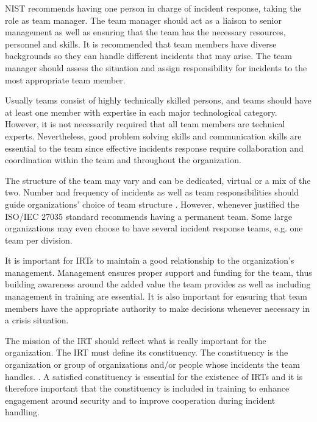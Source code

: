 \ac{NIST} recommends having one person in charge of incident response, taking the role as team manager. The team manager should act as a liaison to senior management as well as ensuring that the team has the necessary resources, personnel and skills. It is recommended that team members have diverse backgrounds so they can handle different incidents that may arise. The team manager should assess the situation and assign responsibility for incidents to the most appropriate team member.

Usually teams consist of highly technically skilled persons, and teams should have at least one member with expertise in each major technological category. However, it is not necessarily required that all team members are technical experts. Nevertheless, good problem solving skills and communication skills are essential to the team since effective incidents response require collaboration and coordination within the team and throughout the organization. 

The structure of the team may vary and can be dedicated, virtual or a mix of the two. Number and frequency of incidents as well as team responsibilities should guide organizations' choice of team structure \cite{ISO/IEC27035}. However, whenever justified the ISO/IEC 27035 standard recommends having a permanent team. Some large organizations may even choose to have several incident response teams, e.g. one team per division.

%
It is important for \acp{IRT} to maintain a good relationship to the organization's management. Management ensures proper support and funding for the team, thus building awareness around the added value the team provides as well as including management in training are essential. It is also important for ensuring that team members have the appropriate authority to make decisions whenever necessary in a crisis situation. 

The mission of the \ac{IRT} should reflect what is really important for the organization. The \ac{IRT} must define its constituency. The constituency is the organization or group of organizations and/or people whose incidents the team handles. \cite{enisaGuide}. A satisfied constituency is essential for the existence of \acp{IRT} and it is therefore important that the constituency is included in training to enhance engagement around security and to improve cooperation during incident handling. 

